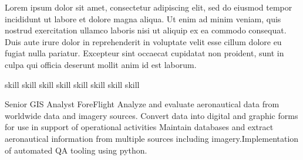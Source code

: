 \documentclass[letterpaper]{ReadableCV}
\begin{document}
	






\showHeader



Lorem ipsum dolor sit amet, consectetur adipiscing elit, sed do eiusmod tempor incididunt ut labore et dolore magna aliqua. Ut enim ad minim veniam, quis nostrud exercitation ullamco laboris nisi ut aliquip ex ea commodo consequat. Duis aute irure dolor in reprehenderit in voluptate velit esse cillum dolore eu fugiat nulla pariatur. Excepteur sint occaecat cupidatat non proident, sunt in culpa qui officia deserunt mollit anim id est laborum.


		  {skill}
		  {skill}
		  {skill}
		  {skill}
		  {skill}
		  {skill}
		  {skill}
		  {skill}
		  


{}
        {Senior GIS Analyst}
        {ForeFlight}
        {Analyze and evaluate aeronautical data from worldwide data and imagery sources. Convert data into digital and graphic forms for use in support of operational activities Maintain databases and extract aeronautical information from multiple sources including imagery.Implementation of automated QA tooling using python.}
\end{document}
